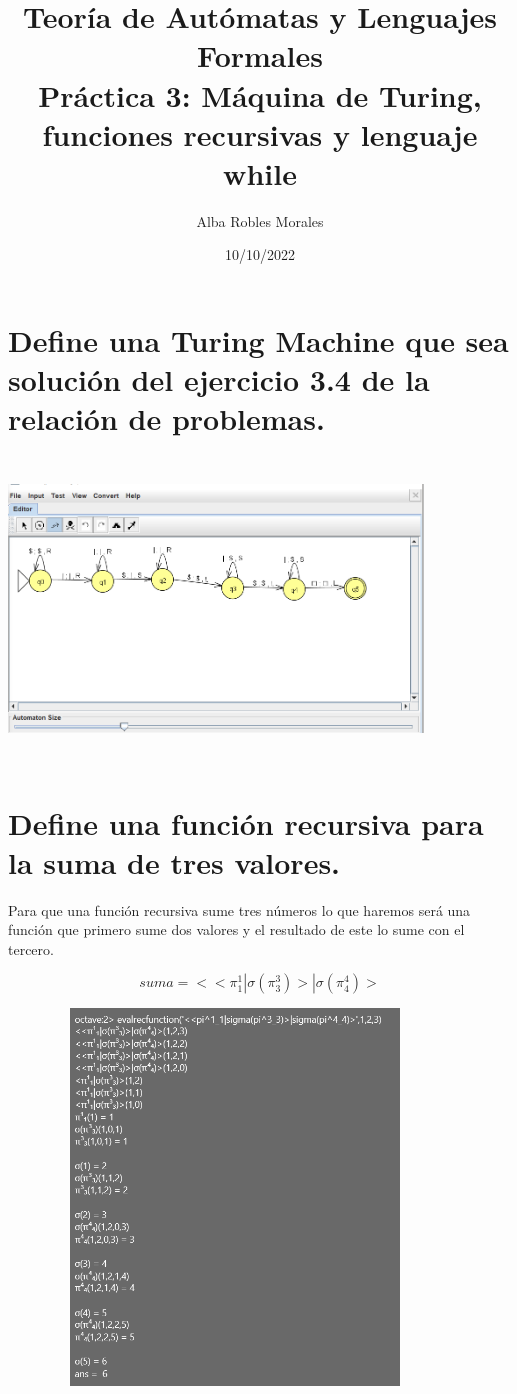 \documentclass[fleqn, 10pt]{article}
\title{Teoría de Autómatas y Lenguajes Formales\\[.4\baselineskip]Práctica 3: Máquina de Turing, funciones recursivas y lenguaje while}
\author{Alba Robles Morales}
\date{10/10/2022}
\theoremstyle{plain}
\theoremstyle{definition}
\begin{document}
\maketitle

\section{Define una Turing Machine que sea solución del ejercicio 3.4 de la relación de problemas. }

\begin{center}
\includegraphics[width=11cm, height=8cm]{1_pract3.png}
\end{center}

\section {Define una función recursiva para la suma de tres valores.}

Para que una función recursiva sume tres números lo que haremos será una función que primero sume dos valores y el resultado de este lo sume con el tercero.

\begin{equation}
suma=<<\pi^1_1|\sigma(\pi^3_3)>|\sigma(\pi^4_4)>
\end {equation}
\begin{center}
\includegraphics[width=12cm, height=10cm]{talf_pract3_ej2.png}
\end{center}
\end{document}
